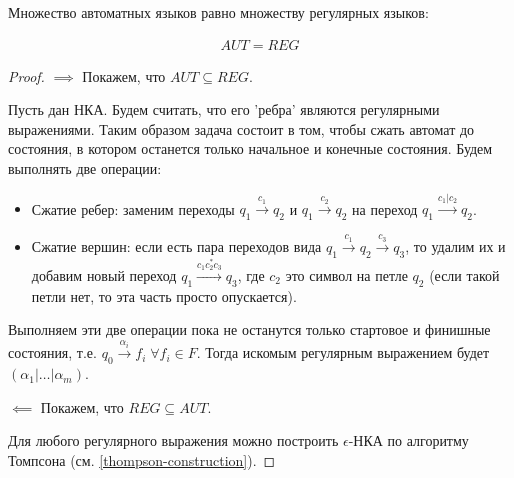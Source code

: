 
\begin{theorem}
  Множество автоматных языков равно множеству регулярных языков:

  \begin{align*}
    AUT = REG
  \end{align*}
\end{theorem}
\begin{proof}
  \(\implies\) Покажем, что \(AUT \subseteq REG\).
  
  Пусть дан НКА. Будем считать, что его 'ребра' являются регулярными
  выражениями. Таким образом задача состоит в том, чтобы сжать автомат до
  состояния, в котором останется только начальное и конечные состояния.
  Будем выполнять две операции:

  \begin{itemize}
    \item Сжатие ребер: заменим переходы \(q_{1} \xrightarrow{c_{1}} q_{2}\) и
    \(q_{1} \xrightarrow{c_{2}} q_{2}\) на переход
    \(q_{1} \xrightarrow{c_{1} | c_{2}} q_{2}\).

    \item Сжатие вершин: если есть пара переходов вида
    \(q_{1} \xrightarrow{c_{1}} q_{2} \xrightarrow{c_{3}} q_{3}\),
    то удалим их и добавим новый переход
    \(q_{1} \xrightarrow{c_{1} c_{2}^{*} c_{3}} q_{3}\),
    где \(c_{2}\) это символ на петле \(q_{2}\) (если такой петли нет, то эта
    часть просто опускается).
  \end{itemize}

  Выполняем эти две операции пока не останутся только стартовое и финишные
  состояния, т.е.
  \(q_{0} \xrightarrow{\alpha_{i}} f_{i} \; \forall f_{i} \in F\).
  Тогда искомым регулярным выражением будет
  \((\alpha_{1} | \dots | \alpha_{m})\).

  \(\impliedby\) Покажем, что \(REG \subseteq AUT\).
  
  Для любого регулярного выражения можно построить \(\epsilon\)-НКА по алгоритму
  Томпсона (см. \ref{thompson-construction}).
\end{proof}
